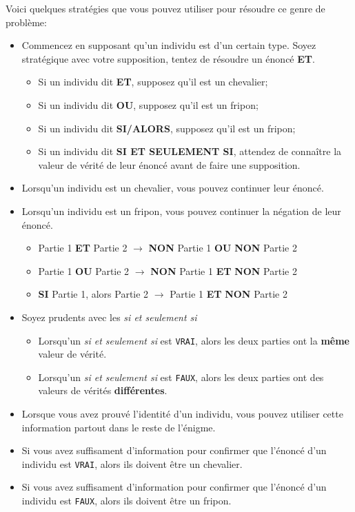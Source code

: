 \documentclass[
  letterpaper,
]{scrbook}
\providecommand{\tightlist}{%
  \setlength{\itemsep}{0pt}\setlength{\parskip}{0pt}}\usepackage{longtable,booktabs,array}
\theoremstyle{definition}
\theoremstyle{definition}
\theoremstyle{plain}
\theoremstyle{remark}
\begin{document}
Voici quelques stratégies que vous pouvez utiliser pour résoudre ce
genre de problème:

\begin{itemize}
\tightlist
\item
  Commencez en supposant qu'un individu est d'un certain type. Soyez
  stratégique avec votre supposition, tentez de résoudre un énoncé
  \textbf{ET}.

  \begin{itemize}
  \tightlist
  \item
    Si un individu dit \textbf{ET}, supposez qu'il est un chevalier;
  \item
    Si un individu dit \textbf{OU}, supposez qu'il est un fripon;
  \item
    Si un individu dit \textbf{SI/ALORS}, supposez qu'il est un fripon;
  \item
    Si un individu dit \textbf{SI ET SEULEMENT SI}, attendez de
    connaître la valeur de vérité de leur énoncé avant de faire une
    supposition.
  \end{itemize}
\item
  Lorsqu'un individu est un chevalier, vous pouvez continuer leur
  énoncé.
\item
  Lorsqu'un individu est un fripon, vous pouvez continuer la négation de
  leur énoncé.

  \begin{itemize}
  \tightlist
  \item
    Partie 1 \textbf{ET} Partie 2 \(\rightarrow\) \textbf{NON} Partie 1
    \textbf{OU} \textbf{NON} Partie 2
  \item
    Partie 1 \textbf{OU} Partie 2 \(\rightarrow\) \textbf{NON} Partie 1
    \textbf{ET} \textbf{NON} Partie 2
  \item
    \textbf{SI} Partie 1, alors Partie 2 \(\rightarrow\) Partie 1
    \textbf{ET} \textbf{NON} Partie 2
  \end{itemize}
\item
  Soyez prudents avec les \emph{si et seulement si}

  \begin{itemize}
  \tightlist
  \item
    Lorsqu'un \emph{si et seulement si} est \texttt{VRAI}, alors les
    deux parties ont la \textbf{même} valeur de vérité.
  \item
    Lorsqu'un \emph{si et seulement si} est \texttt{FAUX}, alors les
    deux parties ont des valeurs de vérités \textbf{différentes}.
  \end{itemize}
\item
  Lorsque vous avez prouvé l'identité d'un individu, vous pouvez
  utiliser cette information partout dans le reste de l'énigme.
\item
  Si vous avez suffisament d'information pour confirmer que l'énoncé
  d'un individu est \texttt{VRAI}, alors ils doivent être un chevalier.
\item
  Si vous avez suffisament d'information pour confirmer que l'énoncé
  d'un individu est \texttt{FAUX}, alors ils doivent être un fripon.
\end{itemize}
\end{document}
